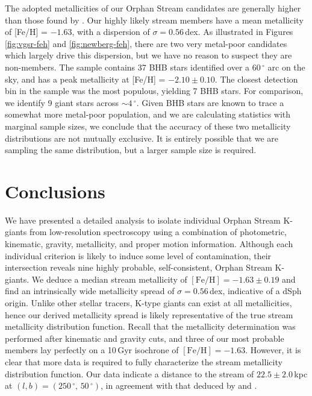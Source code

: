 \documentclass[10pt,apjl]{emulateapj}
\begin{document}
The adopted metallicities of our Orphan Stream candidates are generally higher than those found by \citet{Newberg_et-al_2010}. Our highly likely stream members have a mean metallicity of [Fe/H] = $-1.63$, with a dispersion of $\sigma = 0.56$\,dex. As illustrated in Figures \ref{fig:vgsr-feh} and \ref{fig:newberg-feh}, there are two very metal-poor candidates which largely drive this dispersion, but we have no reason to suspect they are non-members. The \citet{Newberg_et-al_2010} sample contains 37 BHB stars identified over a 60\,$^\circ$ arc on the sky, and has a peak metallicity at [Fe/H] = $-2.10 \pm 0.10$. The closest detection bin in the \citet{Newberg_et-al_2010} sample was the most populous, yielding 7 BHB stars. For comparison, we identify 9 giant stars across $\sim{}4\,^\circ$. Given BHB stars are known to trace a somewhat more metal-poor population, and we are calculating statistics with marginal sample sizes, we conclude that the accuracy of these two metallicity distributions are not mutually exclusive. It is entirely possible that we are sampling the same distribution, but a larger sample size is required.


\section{Conclusions}
\label{sec:conclusions}

We have presented a detailed analysis to isolate individual Orphan Stream K-giants from low-resolution spectroscopy using a combination of photometric, kinematic, gravity, metallicity, and proper motion information. Although each individual criterion is likely to induce some level of contamination, their intersection reveals nine highly probable, self-consistent, Orphan Stream K-giants.  We deduce a median stream metallicity of $[\mbox{Fe/H}] = -1.63 \pm 0.19$ and find an intrinsically wide metallicity spread of $\sigma = 0.56$\,dex, indicative of a dSph origin. Unlike other stellar tracers, K-type giants can exist at all metallicities, hence our derived metallicity spread is likely representative of the true stream metallicity distribution function. Recall that the metallicity determination was performed after kinematic and gravity cuts, and three of our most probable members lay perfectly on a 10\,Gyr isochrone of $[\mbox{Fe/H}] = -1.63$. However, it is clear that more data is required to fully characterize the stream metallicity distribution function. Our data indicate a distance to the stream of $22.5 \pm 2.0$\,kpc at $(l, b) = (250\,^\circ,\,50\,^\circ)$, in agreement with that deduced by \citet{Grillmair_2006} and \citet{Newberg_et-al_2010}.
\end{document}
